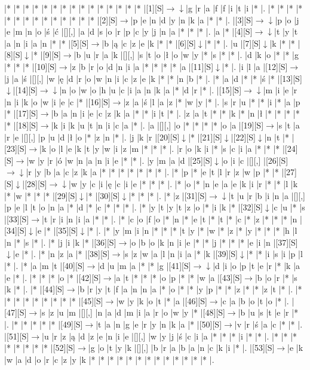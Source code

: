 \documentclass[11pt]{article}
\newcommand\drarr{$\rightarrow \!\!\!\!\! \downarrow$}
\newcommand\rarr{$\rightarrow$}
\newcommand\darr{$\downarrow$}
\begin{document}
\noindent\begin{Puzzle}{24}{31}|*	|*	|*	|*	|*	|*	|*	|*	|*	|*	|*	|*	|*	|*	|*	|[1][S]\drarr	|g	|r	|a	|f	|f	|i	|t	|i	|*	|.
|*	|*	|*	|*	|*	|*	|*	|*	|*	|*	|*	|*	|*	|*	|[2][S]\rarr	|p	|e	|n	|d	|y	|n	|k	|a	|*	|*	|.
|[3][S]\drarr	|p	|o	|j	|e	|m	|n	|o	|ś	|ć	|[][,]{ }	|a	|d	|s	|o	|r	|p	|c	|y	|j	|n	|a	|*	|*	|*	|.
|a	|*	|[4][S]\drarr	|t	|y	|t	|a	|n	|i	|a	|n	|*	|*	|[5][S]\rarr	|b	|ą	|c	|z	|e	|k	|*	|*	|[6][S]\darr	|*	|*	|.
|u	|[7][S]\darr	|k	|*	|*	|[8][S]\darr	|*	|[9][S]\rarr	|b	|u	|r	|a	|k	|[][,]{ }	|s	|t	|o	|ł	|o	|w	|y	|*	|s	|*	|*	|.
|d	|k	|o	|*	|*	|g	|*	|*	|*	|[10][S]\rarr	|z	|b	|r	|o	|d	|n	|i	|a	|*	|*	|*	|*	|a	|[11][S]\darr	|*	|.
|i	|l	|a	|[12][S]\rarr	|j	|a	|ś	|[][,]{ }	|w	|ę	|d	|r	|o	|w	|n	|i	|c	|z	|e	|k	|*	|*	|n	|b	|*	|.
|*	|a	|d	|*	|*	|ś	|*	|[13][S]\darr	|[14][S]\drarr	|n	|o	|w	|o	|h	|u	|c	|i	|a	|n	|k	|a	|*	|d	|r	|*	|.
|[15][S]\drarr	|m	|i	|e	|r	|n	|i	|k	|o	|w	|i	|e	|c	|*	|[16][S]\rarr	|z	|a	|ś	|l	|a	|z	|*	|w	|y	|*	|.
|s	|r	|u	|*	|*	|i	|*	|a	|p	|*	|[17][S]\rarr	|b	|a	|n	|i	|e	|c	|z	|k	|a	|*	|*	|i	|t	|*	|.
|z	|a	|t	|*	|*	|k	|*	|n	|ł	|*	|*	|*	|*	|*	|[18][S]\rarr	|k	|i	|k	|u	|t	|n	|i	|c	|a	|*	|.
|a	|[][,]{ }	|o	|*	|*	|*	|*	|o	|a	|[19][S]\rarr	|s	|t	|a	|r	|e	|[][,]{ }	|p	|u	|d	|ł	|o	|*	|z	|n	|*	|.
|j	|k	|r	|[20][S]\darr	|*	|[21][S]\darr	|[22][S]\darr	|n	|t	|*	|[23][S]\rarr	|k	|o	|l	|e	|k	|t	|y	|w	|i	|z	|m	|*	|*	|*	|.
|r	|o	|k	|i	|*	|s	|c	|i	|a	|*	|*	|*	|[24][S]\rarr	|w	|y	|r	|ó	|w	|n	|a	|n	|i	|e	|*	|*	|.
|y	|m	|a	|d	|[25][S]\darr	|o	|i	|c	|[][,]{ }	|[26][S]\drarr	|r	|y	|b	|a	|c	|z	|k	|a	|*	|*	|*	|*	|*	|*	|*	|.
|*	|p	|*	|e	|t	|l	|r	|z	|w	|p	|*	|*	|[27][S]\darr	|[28][S]\drarr	|w	|y	|c	|i	|ę	|c	|i	|e	|*	|*	|*	|.
|*	|o	|*	|n	|e	|a	|e	|k	|i	|r	|*	|*	|l	|k	|*	|w	|*	|*	|*	|[29][S]\darr	|*	|[30][S]\darr	|*	|*	|*	|.
|*	|z	|[31][S]\drarr	|t	|u	|r	|b	|i	|n	|a	|[][,]{ }	|p	|e	|l	|t	|o	|n	|a	|*	|d	|*	|c	|*	|*	|*	|.
|*	|y	|t	|y	|t	|z	|o	|*	|i	|k	|*	|[32][S]\darr	|c	|u	|*	|s	|[33][S]\rarr	|t	|r	|i	|n	|i	|a	|*	|*	|.
|*	|c	|o	|f	|o	|*	|n	|*	|e	|t	|*	|t	|*	|c	|*	|z	|*	|*	|*	|n	|[34][S]\darr	|e	|*	|[35][S]\darr	|*	|.
|*	|y	|m	|i	|n	|*	|*	|*	|t	|y	|*	|w	|*	|z	|*	|y	|*	|*	|*	|h	|l	|n	|*	|s	|*	|.
|*	|j	|i	|k	|*	|[36][S]\rarr	|o	|b	|o	|k	|n	|i	|e	|*	|*	|j	|*	|*	|*	|e	|i	|n	|[37][S]\darr	|e	|*	|.
|*	|n	|z	|a	|*	|[38][S]\rarr	|s	|z	|w	|a	|l	|n	|i	|a	|*	|k	|[39][S]\darr	|*	|*	|i	|s	|i	|p	|l	|*	|.
|*	|a	|m	|t	|[40][S]\rarr	|d	|u	|m	|a	|*	|*	|g	|[41][S]\drarr	|d	|i	|o	|p	|t	|e	|r	|*	|k	|a	|e	|*	|.
|*	|*	|*	|o	|*	|[42][S]\rarr	|a	|t	|*	|*	|*	|o	|p	|*	|*	|w	|a	|[43][S]\rarr	|b	|o	|r	|*	|s	|k	|*	|.
|*	|[44][S]\rarr	|b	|r	|y	|t	|f	|a	|n	|n	|a	|*	|o	|*	|*	|y	|p	|*	|*	|z	|*	|*	|z	|t	|*	|.
|*	|*	|*	|*	|*	|*	|*	|*	|*	|[45][S]\rarr	|w	|y	|k	|o	|t	|*	|a	|[46][S]\rarr	|c	|a	|b	|o	|t	|o	|*	|.
|[47][S]\rarr	|s	|z	|u	|m	|[][,]{ }	|n	|a	|d	|m	|i	|a	|r	|o	|w	|y	|*	|[48][S]\rarr	|b	|u	|s	|t	|e	|r	|*	|.
|*	|*	|*	|*	|*	|[49][S]\rarr	|t	|a	|n	|g	|e	|r	|y	|n	|k	|a	|*	|[50][S]\rarr	|v	|r	|ś	|a	|c	|*	|*	|.
|[51][S]\rarr	|u	|r	|z	|ą	|d	|z	|e	|n	|i	|e	|[][,]{ }	|w	|y	|j	|ś	|c	|i	|a	|*	|*	|*	|i	|*	|*	|.
|*	|*	|*	|*	|*	|*	|*	|*	|[52][S]\rarr	|g	|o	|t	|y	|k	|[][,]{ }	|b	|r	|a	|b	|a	|n	|c	|k	|i	|*	|.
|[53][S]\rarr	|e	|k	|w	|a	|d	|o	|r	|c	|z	|y	|k	|*	|*	|*	|*	|*	|*	|*	|*	|*	|*	|*	|*	|*	|.\end{Puzzle}
\end{document}
